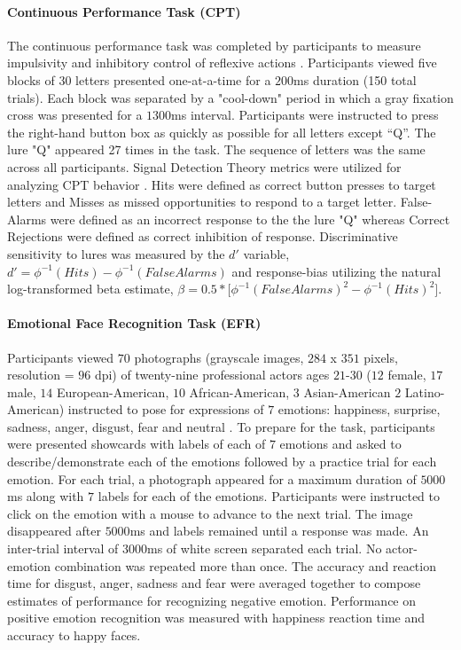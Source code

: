 \documentclass[utf8]{frontiersSCNS} %
\begin{document}
\paragraph{Continuous Performance Task (CPT)} The continuous performance task was completed by participants to measure impulsivity and inhibitory control of reflexive actions \citep{horn2003response}.  Participants viewed five blocks of $30$ letters presented one-at-a-time for a $200$ms duration (150 total trials). Each block was separated by a "cool-down" period in which a gray fixation cross was presented for a $1300$ms interval. Participants were instructed to press the right-hand button box as quickly as possible for all letters except “Q”. The lure "Q" appeared 27 times in the task. The sequence of letters was the same across all participants.  Signal Detection Theory metrics were utilized for analyzing CPT behavior \cite{stanislaw1999calculation}. Hits were defined as correct button presses to target letters and Misses as missed opportunities to respond to a target letter. False-Alarms were defined as an incorrect response to the the lure "Q" whereas Correct Rejections were defined as correct inhibition of response. Discriminative sensitivity to lures was measured by the $d'$ variable, $d'=\phi^{-1}( Hits ) - \phi^{-1}( False Alarms )$ and response-bias utilizing the natural log-transformed beta estimate, $ \beta = 0.5*\Big[\phi^{-1}(FalseAlarms)^{2} - \phi^{-1}(Hits)^{2}\Big]$. 
\paragraph{Emotional Face Recognition Task (EFR)} Participants viewed $70$ photographs (grayscale images, $284$ x $351$ pixels, resolution = $96$ dpi) of twenty-nine professional actors ages $21$-$30$ ($12$ female, $17$ male, $14$ European-American, $10$ African-American, $3$ Asian-American $2$ Latino-American) instructed to pose for expressions of $7$ emotions: happiness, surprise, sadness, anger, disgust, fear and neutral \citep{tottenham2009nimstim}. To prepare for the task, participants were presented showcards with labels of each of $7$ emotions and asked to describe/demonstrate each of the emotions followed by a practice trial for each emotion. For each trial, a photograph appeared for a maximum duration of $5000$ms along with $7$ labels for each of the emotions. Participants were instructed to click on the emotion with a mouse to advance to the next trial. The image disappeared after $5000$ms and labels remained until a response was made. An inter-trial interval of $3000$ms of white screen separated each trial. No actor-emotion combination was repeated more than once. The accuracy and reaction time for disgust, anger, sadness and fear were averaged together to compose estimates of performance for recognizing negative emotion. Performance on positive emotion recognition was measured with happiness reaction time and accuracy to happy faces. 
\end{document}
